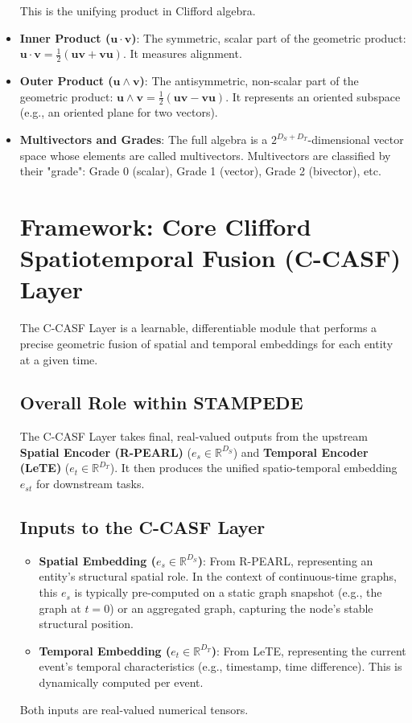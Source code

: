 \documentclass[11pt]{article}
\begin{document}
\begin{itemize}
        This is the unifying product in Clifford algebra.
    \item \textbf{Inner Product ($\mathbf{u} \cdot \mathbf{v}$)}: The symmetric, scalar part of the geometric product: $\mathbf{u} \cdot \mathbf{v} = \frac{1}{2}(\mathbf{uv} + \mathbf{vu})$. It measures alignment.
    \item \textbf{Outer Product ($\mathbf{u} \wedge \mathbf{v}$)}: The antisymmetric, non-scalar part of the geometric product: $\mathbf{u} \wedge \mathbf{v} = \frac{1}{2}(\mathbf{uv} - \mathbf{vu})$. It represents an oriented subspace (e.g., an oriented plane for two vectors).
    \item \textbf{Multivectors and Grades}: The full algebra is a $2^{D_S+D_T}$-dimensional vector space whose elements are called multivectors. Multivectors are classified by their "grade": Grade 0 (scalar), Grade 1 (vector), Grade 2 (bivector), etc.

\section{Framework: Core Clifford Spatiotemporal Fusion (C-CASF) Layer}

The C-CASF Layer is a learnable, differentiable module that performs a precise geometric fusion of spatial and temporal embeddings for each entity at a given time.

\subsection{Overall Role within STAMPEDE}
The C-CASF Layer takes final, real-valued outputs from the upstream \textbf{Spatial Encoder (R-PEARL)} ($e_s \in \mathbb{R}^{D_S}$) and \textbf{Temporal Encoder (LeTE)} ($e_t \in \mathbb{R}^{D_T}$). It then produces the unified spatio-temporal embedding $e_{st}$ for downstream tasks.

\subsection{Inputs to the C-CASF Layer}
\begin{itemize}
    \item \textbf{Spatial Embedding ($e_s \in \mathbb{R}^{D_S}$)}: From R-PEARL, representing an entity's structural spatial role. In the context of continuous-time graphs, this $e_s$ is typically pre-computed on a static graph snapshot (e.g., the graph at $t=0$) or an aggregated graph, capturing the node's stable structural position.
    \item \textbf{Temporal Embedding ($e_t \in \mathbb{R}^{D_T}$)}: From LeTE, representing the current event's temporal characteristics (e.g., timestamp, time difference). This is dynamically computed per event.
\end{itemize}
Both inputs are real-valued numerical tensors.


\end{itemize}
\end{document}
